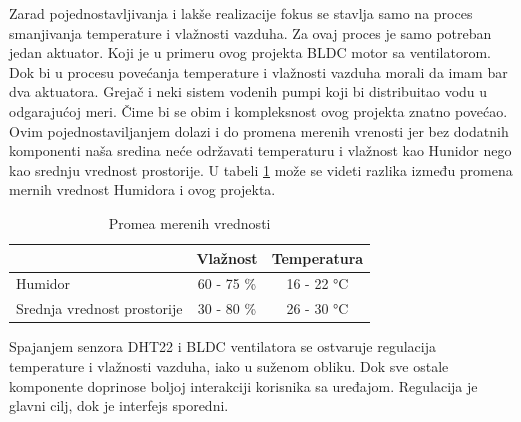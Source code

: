 \documentclass[a4paper, 12pt]{article}
\begin{document}
\vspace{10pt}

Zarad pojednostavljivanja i lakše realizacije fokus se stavlja samo na proces smanjivanja temperature i vlažnosti vazduha. Za ovaj proces je samo potreban jedan aktuator. Koji je u primeru ovog projekta BLDC motor sa ventilatorom. Dok bi u procesu povećanja temperature i vlažnosti vazduha morali da imam bar dva aktuatora. Grejač i neki sistem vodenih pumpi koji bi distribuitao vodu u odgarajućoj meri. Čime bi se obim i kompleksnost ovog projekta znatno povećao. Ovim pojednostaviljanjem dolazi i do promena merenih vrenosti jer bez dodatnih komponenti naša sredina neće održavati temperaturu i vlažnost kao Hunidor nego kao srednju vrednost prostorije. U tabeli \ref{tabela-1} može se videti razlika između promena mernih vrednost Humidora i ovog projekta.

\vspace{10pt}

\begin{table}[H]
\centering
\begin{tabular}{|l|c|c|}
\hline
& Vlažnost & Temperatura\\
\hline
Humidor & 60 - 75 \% & 16 - 22 °C\\
\hline
Srednja vrednost prostorije & 30 - 80 \% & 26 - 30 °C\\
\hline
\end{tabular}
\caption{Promea merenih vrednosti} \label{tabela-1}
\end{table}

Spajanjem senzora DHT22 i BLDC ventilatora se ostvaruje regulacija temperature i vlažnosti vazduha, iako u suženom obliku. Dok sve ostale komponente doprinose boljoj interakciji korisnika sa uređajom. Regulacija je glavni cilj, dok je interfejs sporedni.

%
%
\end{document}
